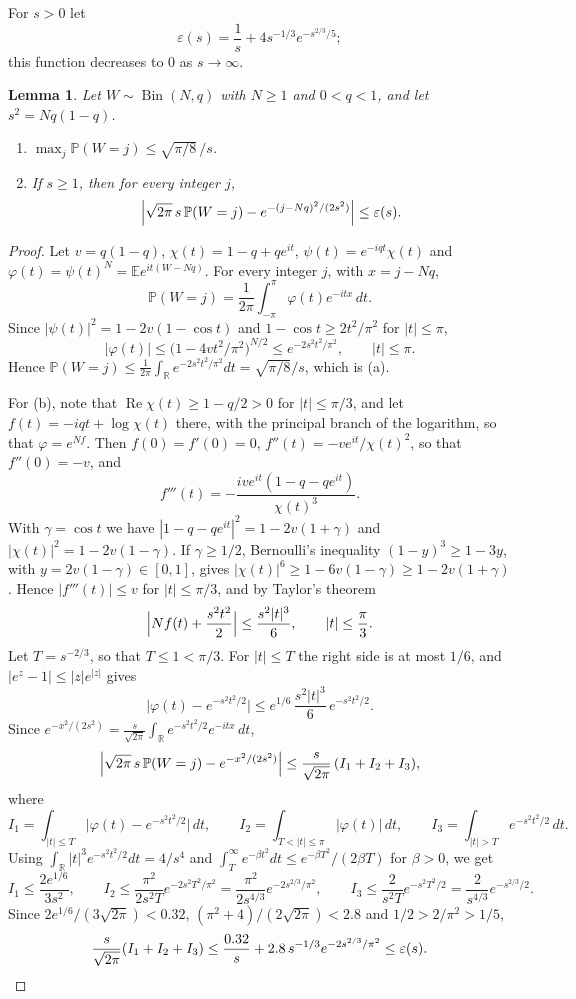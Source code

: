 \documentclass[11pt]{amsart}
\newtheorem{lemma}[theorem]{Lemma}
\theoremstyle{definition}
\theoremstyle{remark}
\numberwithin{equation}{section}
\newcommand{\Pp}{\mathbb P}
\newcommand{\E}{\mathbb E}
\newcommand{\R}{\mathbb R}
\DeclareMathOperator{\Bin}{Bin}
\begin{document}
For $s>0$ let
\[
\varepsilon(s)=\frac1s+4s^{-1/3}e^{-s^{2/3}/5};
\]
this function decreases to $0$ as $s\to\infty$.

\begin{lemma}\label{lem:llt}
Let $W\sim\Bin(N,q)$ with $N\ge1$ and $0<q<1$, and let $s^2=Nq(1-q)$.
\begin{enumerate}[label=(\alph*)]
\item $\max_j\Pp(W=j)\le\sqrt{\pi/8}\,/s$.
\item If $s\ge1$, then for every integer $j$,
\[
\Bigl|\sqrt{2\pi}\,s\,\Pp(W=j)-e^{-(j-Nq)^2/(2s^2)}\Bigr|\le\varepsilon(s).
\]
\end{enumerate}
\end{lemma}

\begin{proof}
Let $v=q(1-q)$, $\chi(t)=1-q+qe^{it}$, $\psi(t)=e^{-iqt}\chi(t)$ and $\varphi(t)=\psi(t)^N=\E e^{it(W-Nq)}$. For every integer $j$, with $x=j-Nq$,
\[
\Pp(W=j)=\frac1{2\pi}\int_{-\pi}^{\pi}\varphi(t)e^{-itx}\,dt.
\]
Since $|\psi(t)|^2=1-2v(1-\cos t)$ and $1-\cos t\ge2t^2/\pi^2$ for $|t|\le\pi$,
\[
|\varphi(t)|\le\bigl(1-4vt^2/\pi^2\bigr)^{N/2}\le e^{-2s^2t^2/\pi^2},\qquad|t|\le\pi.
\]
Hence $\Pp(W=j)\le\frac1{2\pi}\int_\R e^{-2s^2t^2/\pi^2}dt=\sqrt{\pi/8}/s$, which is (a).

For (b), note that $\operatorname{Re}\chi(t)\ge1-q/2>0$ for $|t|\le\pi/3$, and let $f(t)=-iqt+\log\chi(t)$ there, with the principal branch of the logarithm, so that $\varphi=e^{Nf}$. Then $f(0)=f'(0)=0$, $f''(t)=-ve^{it}/\chi(t)^2$, so that $f''(0)=-v$, and
\[
f'''(t)=-\frac{ive^{it}(1-q-qe^{it})}{\chi(t)^3}.
\]
With $\gamma=\cos t$ we have $|1-q-qe^{it}|^2=1-2v(1+\gamma)$ and $|\chi(t)|^2=1-2v(1-\gamma)$. If $\gamma\ge1/2$, Bernoulli's inequality $(1-y)^3\ge1-3y$, with $y=2v(1-\gamma)\in[0,1]$, gives $|\chi(t)|^6\ge1-6v(1-\gamma)\ge1-2v(1+\gamma)$. Hence $|f'''(t)|\le v$ for $|t|\le\pi/3$, and by Taylor's theorem
\[
\Bigl|Nf(t)+\frac{s^2t^2}2\Bigr|\le\frac{s^2|t|^3}6,\qquad|t|\le\frac\pi3.
\]
Let $T=s^{-2/3}$, so that $T\le1<\pi/3$. For $|t|\le T$ the right side is at most $1/6$, and $|e^z-1|\le|z|e^{|z|}$ gives
\[
\bigl|\varphi(t)-e^{-s^2t^2/2}\bigr|\le e^{1/6}\,\frac{s^2|t|^3}6\,e^{-s^2t^2/2}.
\]
Since $e^{-x^2/(2s^2)}=\frac s{\sqrt{2\pi}}\int_\R e^{-s^2t^2/2}e^{-itx}\,dt$,
\[
\Bigl|\sqrt{2\pi}\,s\,\Pp(W=j)-e^{-x^2/(2s^2)}\Bigr|\le\frac s{\sqrt{2\pi}}\,(I_1+I_2+I_3),
\]
where
\[
I_1=\int_{|t|\le T}\bigl|\varphi(t)-e^{-s^2t^2/2}\bigr|\,dt,\qquad I_2=\int_{T<|t|\le\pi}|\varphi(t)|\,dt,\qquad I_3=\int_{|t|>T}e^{-s^2t^2/2}\,dt.
\]
Using $\int_\R|t|^3e^{-s^2t^2/2}dt=4/s^4$ and $\int_T^\infty e^{-\beta t^2}dt\le e^{-\beta T^2}/(2\beta T)$ for $\beta>0$, we get
\[
I_1\le\frac{2e^{1/6}}{3s^2},\qquad I_2\le\frac{\pi^2}{2s^2T}e^{-2s^2T^2/\pi^2}=\frac{\pi^2}{2s^{4/3}}e^{-2s^{2/3}/\pi^2},\qquad I_3\le\frac2{s^2T}e^{-s^2T^2/2}=\frac2{s^{4/3}}e^{-s^{2/3}/2}.
\]
Since $2e^{1/6}/(3\sqrt{2\pi})<0.32$, $(\pi^2+4)/(2\sqrt{2\pi})<2.8$ and $1/2>2/\pi^2>1/5$,
\[
\frac s{\sqrt{2\pi}}(I_1+I_2+I_3)\le\frac{0.32}s+2.8\,s^{-1/3}e^{-2s^{2/3}/\pi^2}\le\varepsilon(s).\qedhere
\]
\end{proof}
\end{document}
